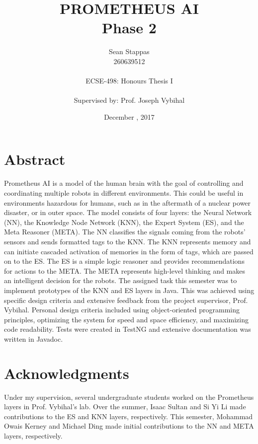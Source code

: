 \documentclass[titlepage,11pt]{article}
\title
{
	\uppercase{Prometheus AI} \\
	\large Phase 2
}
\author %
{
	Sean Stappas \\ 
	260639512 \\
	\\ 
	ECSE-498: Honours Thesis I \\
	\\
	\small Supervised by: Prof. Joseph Vybihal
}
\date{December \nth{7}, 2017}
\begin{document}
	
\sloppy

\maketitle

\section*{Abstract}
Prometheus AI is a model of the human brain with the goal of controlling and coordinating multiple robots in different environments. This could be useful in environments hazardous for humans, such as in the aftermath of a nuclear power disaster, or in outer space. The model consists of four layers: the Neural Network (NN), the Knowledge Node Network (KNN), the Expert System (ES), and the Meta Reasoner (META). The NN classifies the signals coming from the robots' sensors and sends formatted tags to the KNN. The KNN represents memory and can initiate cascaded activation of memories in the form of tags, which are passed on to the ES. The ES is a simple logic reasoner and provides recommendations for actions to the META. The META represents high-level thinking and makes an intelligent decision for the robots. The assigned task this semester was to implement prototypes of the KNN and ES layers in Java. This was achieved using specific design criteria and extensive feedback from the project supervisor, Prof. Vybihal. Personal design criteria included using object-oriented programming principles, optimizing the system for speed and space efficiency, and maximizing code readability. Tests were created in TestNG and extensive documentation was written in Javadoc.

\section*{Acknowledgments}
Under my supervision, several undergraduate students worked on the Prometheus layers in Prof. Vybihal's lab. Over the summer, Isaac Sultan and Si Yi Li made contributions to the ES and KNN layers, respectively. This semester, Mohammad Owais Kerney and Michael Ding made initial contributions to the NN and META layers, respectively.
\end{document}
